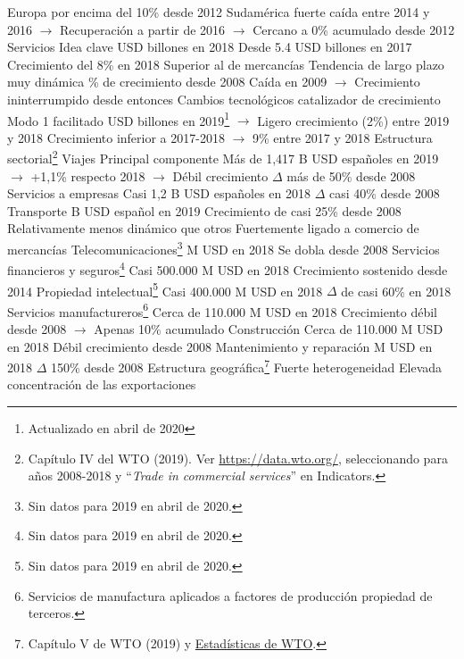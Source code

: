 \documentclass{nuevotema}
\begin{document}
\begin{esquemal}
				\4[] Europa por encima del 10\% desde 2012
				\4[] Sudamérica fuerte caída entre 2014 y 2016
				\4[] $\to$ Recuperación a partir de 2016
				\4[] $\to$ Cercano a 0\% acumulado desde 2012
		\2 Servicios
			\3 Idea clave
				 USD billones en 2018
				\4[] Desde 5.4 USD billones en 2017
				\4 Crecimiento del 8\% en 2018
				\4[] Superior al de mercancías
				\4 Tendencia de largo plazo muy dinámica
				\% de crecimiento desde 2008
				\4[] Caída en 2009
				\4[] $\to$ Crecimiento ininterrumpido desde entonces
				\4 Cambios tecnológicos catalizador de crecimiento
				\4[] Modo 1 facilitado
				 USD billones en 2019\footnote{Actualizado en abril de 2020}
				\4[] $\to$ Ligero crecimiento (2\%) entre 2019 y 2018
				\4[] Crecimiento inferior a 2017-2018
				\4[] $\to$ 9\% entre 2017 y 2018
			\3 Estructura sectorial\footnote{Capítulo IV del WTO (2019). Ver \url{https://data.wto.org/}, seleccionando para años 2008-2018 y ``\textit{Trade in commercial services}'' en Indicators.}
				\4[1] Viajes
				\4[] Principal componente
				\4[] Más de 1,417 B USD españoles en 2019
				\4[] $\to$ +1,1\% respecto 2018
				\4[] $\to$ Débil crecimiento
				\4[] $\Delta$ más de 50\% desde 2008
				\4[2] Servicios a empresas
				\4[] Casi 1,2 B USD españoles en 2018
				\4[] $\Delta$ casi 40\% desde 2008
				\4[3] Transporte
				 B USD español en 2019
				\4[] Crecimiento de casi 25\% desde 2008
				\4[] Relativamente menos dinámico que otros
				\4[] Fuertemente ligado a comercio de mercancías
				\4[4] Telecomunicaciones\footnote{Sin datos para 2019 en abril de 2020.}
				 M USD en 2018
				\4[] Se dobla desde 2008
				\4[5] Servicios financieros y seguros\footnote{Sin datos para 2019 en abril de 2020.}
				\4[] Casi 500.000 M USD en 2018
				\4[] Crecimiento sostenido desde 2014
				\4[6] Propiedad intelectual\footnote{Sin datos para 2019 en abril de 2020.}
				\4[] Casi 400.000 M USD en 2018
				\4[] $\Delta$ de casi 60\% en 2018
				\4[7] Servicios manufactureros\footnote{Servicios de manufactura aplicados a factores de producción propiedad de terceros.}
				\4[] Cerca de 110.000 M USD en 2018
				\4[] Crecimiento débil desde 2008
				\4[] $\to$ Apenas 10\% acumulado
				\4[8] Construcción
				\4[] Cerca de 110.000 M USD en 2018
				\4[] Débil crecimiento desde 2008
				\4[9] Mantenimiento y reparación
				 M USD en 2018
				\4[] $\Delta$ 150\% desde 2008
			\3 Estructura geográfica\footnote{Capítulo V de WTO (2019) y \href{https://data.wto.org/}{Estadísticas de WTO}.}
				\4 Fuerte heterogeneidad
				\4 Elevada concentración de las exportaciones

\end{esquemal}
\end{document}

